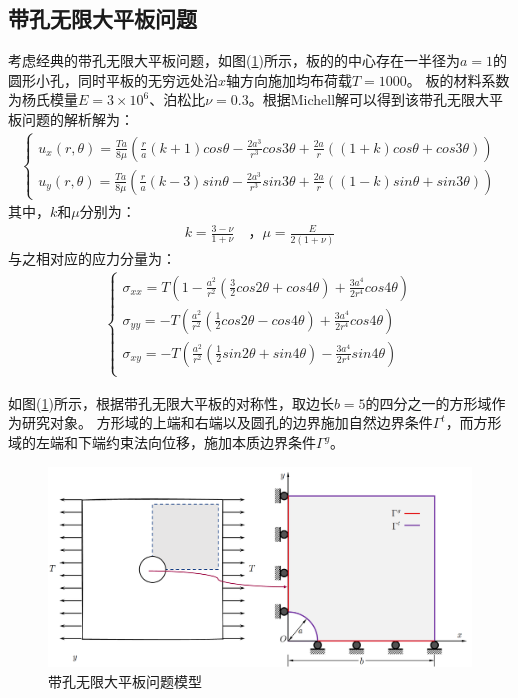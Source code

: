 \subsection{带孔无限大平板问题}
考虑经典的带孔无限大平板问题，如图(\ref{hole})所示，板的的中心存在一半径为$a=1$的圆形小孔，同时平板的无穷远处沿$x$轴方向施加均布荷载$T=1000$。
板的材料系数为杨氏模量$E=3\times10^6$、泊松比$\nu=0.3$。根据Michell解可以得到该带孔无限大平板问题的解析解为：
\begin{equation}
\begin{split}
\begin{cases}
    u_x(r,\theta)=\frac{Ta}{8\mu}(\frac{r}{a}(k+1)cos\theta-\frac{2a^3}{r^3}cos3\theta+\frac{2a}{r}((1+k)cos\theta+cos3\theta))\\
    u_y(r,\theta)=\frac{Ta}{8\mu}(\frac{r}{a}(k-3)sin\theta-\frac{2a^3}{r^3}sin3\theta+\frac{2a}{r}((1-k)sin\theta+sin3\theta))  
\end{cases}
\end{split}
\end{equation}
其中，$k$和$\mu$分别为：
\begin{equation}
\begin{split}
    k=\frac{3-\nu}{1+\nu}\quad \text{，}\mu=\frac{E}{2(1+\nu)}
\end{split}
\end{equation}
与之相对应的应力分量为：
\begin{equation}
\begin{split}
\begin{cases}
    \sigma_{xx}=T(1-\frac{a^2}{r^2}(\frac{3}{2}cos2\theta+cos4\theta)+\frac{3a^4}{2r^4}cos4\theta)\\
    \sigma_{yy}=-T(\frac{a^2}{r^2}(\frac{1}{2}cos2\theta-cos4\theta)+\frac{3a^4}{2r^4}cos4\theta)\\
    \sigma_{xy}=-T(\frac{a^2}{r^2}(\frac{1}{2}sin2\theta+sin4\theta)-\frac{3a^4}{2r^4}sin4\theta)\\
\end{cases}
\end{split}
\end{equation}\par
如图(\ref{hole})所示，根据带孔无限大平板的对称性，取边长$b=5$的四分之一的方形域作为研究对象。
方形域的上端和右端以及圆孔的边界施加自然边界条件$\Gamma^t$，而方形域的左端和下端约束法向位移，施加本质边界条件$\Gamma^g$。
\begin{figure}[H]
\centering
\includegraphics[scale=0.5]{figure/EHR/hole/hole.png}
    \caption{带孔无限大平板问题模型}\label{hole}
\end{figure}
